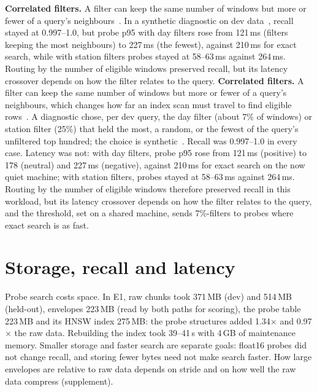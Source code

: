 \documentclass[sigconf]{acmart}
\begin{document}
\ifdefined\SigmodSubmission \textbf{Correlated filters.} A filter can keep the same number of windows but more or fewer of a query's neighbours~\cite{filterstudy}. In a synthetic diagnostic on dev data~\cite{e1}, recall stayed at 0.997--1.0, but probe p95 with day filters rose from 121\,ms (filters keeping the most neighbours) to 227\,ms (the fewest), against 210\,ms for exact search, while with station filters probes stayed at 58--63\,ms against 264\,ms. Routing by the number of eligible windows preserved recall, but its latency crossover depends on how the filter relates to the query.\else
\textbf{Correlated filters.} A filter can keep the same number of windows but more or fewer of a query's neighbours, which changes how far an index scan must travel to find eligible rows~\cite{filterstudy}. A diagnostic chose, per dev query, the day filter (about 7\% of windows) or station filter (25\%) that held the most, a random, or the fewest of the query's unfiltered top hundred; the choice is synthetic~\cite{e1}. Recall was 0.997--1.0 in every case. Latency was not: with day filters, probe p95 rose from 121\,ms (positive) to 178 (neutral) and 227\,ms (negative), against 210\,ms for exact search on the now quiet machine; with station filters, probes stayed at 58--63\,ms against 264\,ms. Routing by the number of eligible windows therefore preserved recall in this workload, but its latency crossover depends on how the filter relates to the query, and the threshold, set on a shared machine, sends 7\%-filters to probes where exact search is as fast.
\fi

\section{Storage, recall and latency}\label{sec:storage}
Probe search costs space. In E1, raw chunks took 371\,MB (dev) and 514\,MB (held-out), envelopes 223\,MB (read by both paths for scoring), the probe table 223\,MB and its HNSW index 275\,MB: the probe structures added 1.34$\times$ and 0.97$\times$ the raw data. Rebuilding the index took 39--41\,s with 4\,GB of maintenance memory. Smaller storage and faster search are separate goals: float16 probes did not change recall, and storing fewer bytes need not make search faster. How large envelopes are relative to raw data depends on stride and on how well the raw data compress (supplement).
\end{document}
